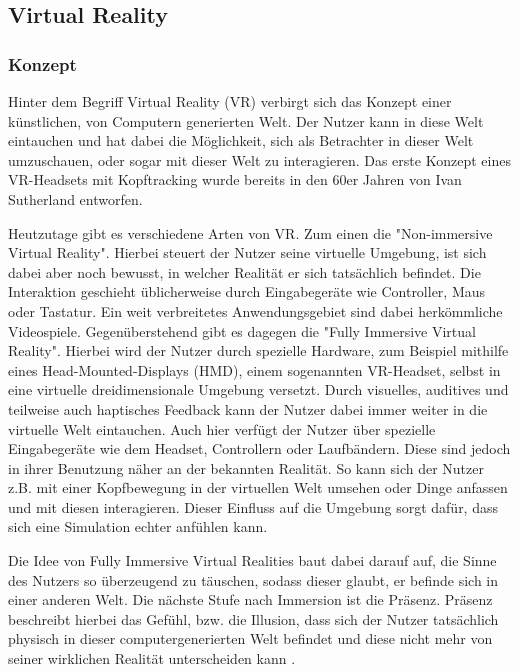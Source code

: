 \subsection{Virtual Reality}
\subsubsection{Konzept}

Hinter dem Begriff Virtual Reality (VR) verbirgt sich das Konzept einer
künstlichen, von Computern generierten Welt.
Der Nutzer kann in diese Welt eintauchen und hat dabei die Möglichkeit, sich als Betrachter in dieser Welt
umzuschauen, oder sogar mit dieser Welt zu interagieren. Das erste Konzept eines VR-Headsets mit Kopftracking
wurde bereits in den 60er Jahren von Ivan Sutherland entworfen. \parencite{Sutherland1965, Sutherland1968}

Heutzutage gibt es verschiedene Arten von VR. Zum einen die "Non-immersive Virtual Reality".
Hierbei steuert der Nutzer seine virtuelle Umgebung, ist sich dabei aber noch bewusst,
in welcher Realität er sich tatsächlich befindet. Die Interaktion geschieht üblicherweise durch
Eingabegeräte wie Controller, Maus oder Tastatur. Ein weit verbreitetes Anwendungsgebiet sind
dabei herkömmliche Videospiele. Gegenüberstehend gibt es dagegen die "Fully Immersive Virtual Reality".
Hierbei wird der Nutzer durch spezielle Hardware, zum Beispiel mithilfe eines Head-Mounted-Displays (HMD),
einem sogenannten VR-Headset, selbst in eine virtuelle dreidimensionale Umgebung versetzt.
Durch visuelles, auditives und teilweise auch haptisches Feedback kann der Nutzer dabei immer weiter
in die virtuelle Welt eintauchen.
Auch hier verfügt der Nutzer über spezielle Eingabegeräte wie dem Headset, Controllern oder Laufbändern. Diese sind
jedoch in ihrer Benutzung näher an der bekannten Realität. So kann sich der Nutzer z.B. mit einer Kopfbewegung
in der virtuellen Welt umsehen oder Dinge anfassen und mit diesen interagieren. Dieser Einfluss auf die
Umgebung sorgt dafür, dass sich eine Simulation echter anfühlen kann.

Die Idee von Fully Immersive Virtual Realities baut dabei darauf auf, die Sinne des Nutzers so überzeugend zu täuschen,
sodass dieser glaubt, er befinde sich in einer anderen Welt. Die nächste Stufe nach Immersion ist die
Präsenz. Präsenz beschreibt hierbei das Gefühl, bzw. die Illusion, dass sich der Nutzer tatsächlich
physisch in dieser computergenerierten Welt befindet und diese nicht mehr von seiner wirklichen Realität unterscheiden kann
\parencite{Schuemie2001}.



